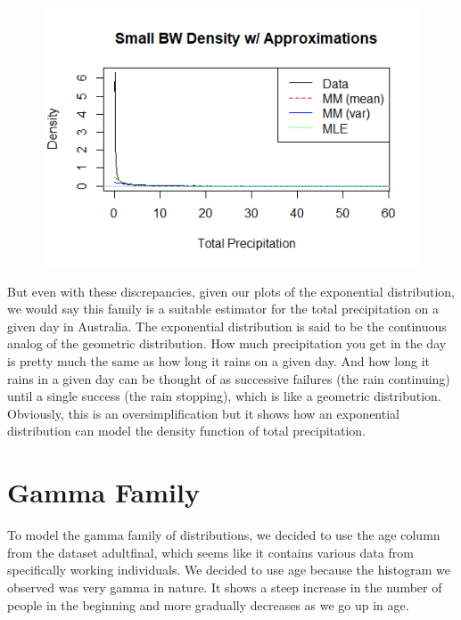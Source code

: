 \documentclass[12pt, a4paper, oneside]{report}
\begin{document}
\begin{figure}[h]
  \centering
  \includegraphics[width=0.8\linewidth]{expDensitySmallA.png} %
\end{figure}

\newpage
But even with these discrepancies, given our plots of the exponential distribution, we would say this family is a suitable estimator for the total precipitation on a given day in Australia. The exponential distribution is said to be the continuous analog of the geometric distribution. How much precipitation you get in the day is pretty much the same as how long it rains on a given day. And how long it rains in a given day can be thought of as successive failures (the rain continuing) until a single success (the rain stopping), which is like a geometric distribution. Obviously, this is an oversimplification but it shows how an exponential distribution can model the density function of total precipitation.



















\newpage
\section*{Gamma Family}
To model the gamma family of distributions, we decided to use the age column from the dataset adultfinal, which seems like it contains various data from specifically working individuals. We decided to use age because the histogram we observed was very gamma in nature. It shows a steep increase in the number of people in the beginning and more gradually decreases as we go up in age.
\end{document}
